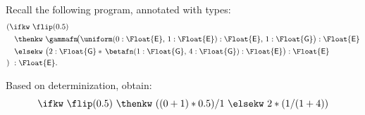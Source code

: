 \begin{example}
  Recall the following program, annotated with types:
  \[
    \begin{aligned}
    &(\ifkw\ \flip(0.5) \\
    &\quad \thenkw\ \gammafn\!\big(
      \uniform(0 : \Float{\E},\, 1 : \Float{\E}) : \Float{\E},\,
      1 : \Float{\G}
    \big) : \Float{\E} \\
    &\quad \elsekw\ \big(
      2 : \Float{\G}
      *\,
      \betafn(1 : \Float{\G},\, 4 : \Float{\G}) : \Float{\E}
    \big) : \Float{\E} \\
    &)\ : \Float{\E}.
    \end{aligned}
  \]

  Based on determinization, obtain:
  \[
    \ifkw\ \flip( 0.5 )\ \thenkw\ (( 0 + 1 ) * 0.5) / 1\ \elsekw\ 2 * ( 1 / ( 1 + 4 ) )
  \]
\end{example}


